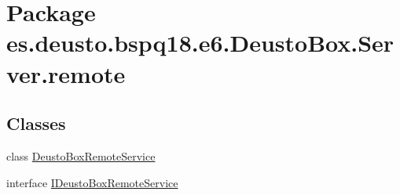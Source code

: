 \hypertarget{namespacees_1_1deusto_1_1bspq18_1_1e6_1_1_deusto_box_1_1_server_1_1remote}{}\section{Package es.\+deusto.\+bspq18.\+e6.\+Deusto\+Box.\+Server.\+remote}
\label{namespacees_1_1deusto_1_1bspq18_1_1e6_1_1_deusto_box_1_1_server_1_1remote}
\subsection*{Classes}
\begin{DoxyCompactItemize}
\item 
class \mbox{\hyperlink{classes_1_1deusto_1_1bspq18_1_1e6_1_1_deusto_box_1_1_server_1_1remote_1_1_deusto_box_remote_service}{Deusto\+Box\+Remote\+Service}}
\item 
interface \mbox{\hyperlink{interfacees_1_1deusto_1_1bspq18_1_1e6_1_1_deusto_box_1_1_server_1_1remote_1_1_i_deusto_box_remote_service}{I\+Deusto\+Box\+Remote\+Service}}
\end{DoxyCompactItemize}
